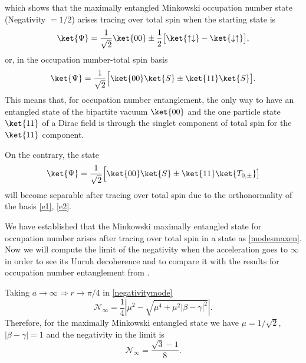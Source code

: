 which shows that the maximally entangled Minkowski occupation number state (Negativity $=1/2$) arises tracing over total spin when the starting state is
\begin{equation}\label{modesmaxen}
\ket{\Psi}=\frac{1}{\sqrt2}\ket{00}\pm\frac12\big[\ket{\uparrow\downarrow}-\ket{\downarrow\uparrow}\big],
\end{equation}
or, in the occupation number-total spin basis
\begin{equation}\label{modesmaxen2}
\ket{\Psi}=\frac{1}{\sqrt2}\Big[\ket{00}\ket{S}\pm\ket{11}\ket{S}\big].
\end{equation}
This means that, for occupation number entanglement, the only way to have an entangled state of the bipartite vacuum $\ket{00}$ and the one particle state $\ket{11}$ of a Dirac field is through the singlet component of total spin for the $\ket{11}$ component.

On the contrary, the state
\begin{equation}
\ket{\Psi}=\frac{1}{\sqrt2}\Big[\ket{00}\ket{S}\pm\ket{11}\ket{T_{0,\pm}}\big]
\end{equation}
will become separable after tracing over total spin due to the orthonormality of the basis \eqref{e1}, \eqref{e2}.

We have established that the Minkowski maximally entangled state for occupation number arises after tracing over total spin in a state as \eqref{modesmaxen}. Now we will compute the limit of the negativity when the acceleration goes to $\infty$ in order to see its Unruh decoherence and to compare it with the results for occupation number entanglement from \cite{AlsingSchul}.

Taking $a\rightarrow\infty \Rightarrow r\rightarrow\pi/4$ in \eqref{negativitymode}
\begin{equation}\label{negativitymodeinfty}
\mathcal{N}_\infty=\frac14\left|\mu^2-\sqrt{\mu^4+\mu^2|\beta-\gamma|^2}\right|.
\end{equation}
Therefore, for the maximally Minkowski entangled state we have $\mu=1/\sqrt{2}$, $|\beta-\gamma|=1$ and the negativity in the limit is
\begin{equation}\label{negalimi}
\mathcal{N}_\infty=\frac{\sqrt3-1}{8}.
\end{equation}


